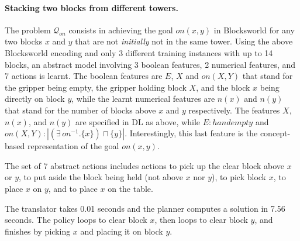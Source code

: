 \documentclass[letterpaper]{article} %
\newcommand{\abs}[1]{\ensuremath{\left\vert{#1}\right\vert}}
\newcommand{\Q}{\mathcal{Q}}
\begin{document}
\paragraph{Stacking two blocks from different towers.}
The problem $\Q_{on}$ consists in achieving the goal $on(x,y)$
in Blocksworld for any two blocks $x$ and $y$ that are not
\emph{initially} not in the same tower.
Using the above Blocksworld encoding and only 3 different training
instances with up to 14 blocks, an abstract model involving 3 boolean
features, 2 numerical features, and 7 actions is learnt.
The boolean features are $E$, $X$ and $on(X,Y)$ that stand for the gripper
being empty, the gripper holding block $X$, and the block $x$ being directly on
block $y$, while the learnt numerical features are $n(x)$ and $n(y)$ that stand
for the number of blocks above $x$ and $y$ respectively.
The features $X$, $n(x)$, and $n(y)$ are specified in DL as above,
while $E: handempty$ and $on(X,Y): \abs{(\exists\,on^{-1}.\{x\}) \sqcap \{y\}}$.
Interestingly, this last feature is the concept-based representation
of the goal $on(x,y)$.


The set of 7 abstract actions includes actions to pick up the clear
block above $x$ or $y$, to put aside the block being held (not above
$x$ nor $y$), to pick block $x$, to place $x$ on $y$, and to place
$x$ on the table.

The translator takes 0.01 seconds and the planner computes a
solution in 7.56 seconds. The policy loops to clear block $x$, then
loops to clear block $y$, and finishes by picking $x$ and
placing it on block $y$.
\end{document}

